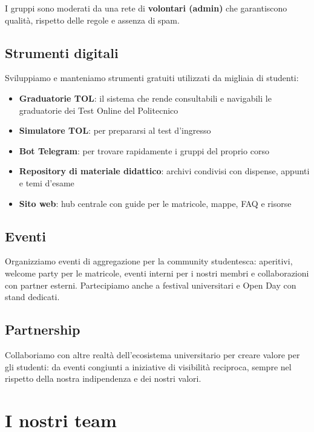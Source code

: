 \documentclass[report]{polinetwork}
\begin{document}
I gruppi sono moderati da una rete di \textbf{volontari (admin)} che
garantiscono qualità, rispetto delle regole e assenza di spam.

\subsection{Strumenti digitali}

Sviluppiamo e manteniamo strumenti gratuiti utilizzati da migliaia
di studenti:

\begin{itemize}
  \item \textbf{Graduatorie TOL}: il sistema che rende consultabili
    e navigabili le graduatorie dei Test Online del Politecnico
  \item \textbf{Simulatore TOL}: per prepararsi al test d'ingresso
  \item \textbf{Bot Telegram}: per trovare rapidamente i gruppi del
    proprio corso
  \item \textbf{Repository di materiale didattico}: archivi condivisi
    con dispense, appunti e temi d'esame
  \item \textbf{Sito web}: hub centrale con guide per le matricole,
    mappe, FAQ e risorse
\end{itemize}

\subsection{Eventi}

Organizziamo eventi di aggregazione per la community studentesca:
aperitivi, welcome party per le matricole, eventi interni per i
nostri membri e collaborazioni con partner esterni. Partecipiamo
anche a festival universitari e Open Day con stand dedicati.

\subsection{Partnership}

Collaboriamo con altre realtà dell'ecosistema universitario per
creare valore per gli studenti: da eventi congiunti a iniziative
di visibilità reciproca, sempre nel rispetto della nostra
indipendenza e dei nostri valori.

\section{I nostri team}
\end{document}
